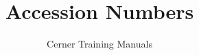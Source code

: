 

\title{Accession Numbers} %
\author{Cerner Training Manuals}



    \frontmatter
        \maketitle %
        \begin{fullwidth}
        \tableofcontents
        \end{fullwidth}

    \mainmatter
        

    \backmatter






